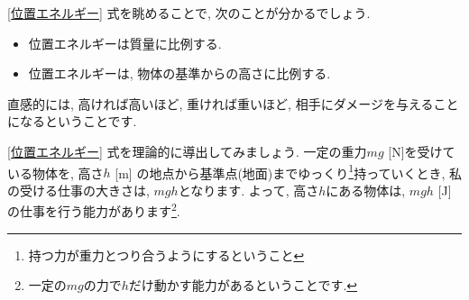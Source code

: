 \documentclass[11pt,dvipdfmx]{jsarticle}
\numberwithin{equation}{section} %
\begin{document}
\eqref{位置エネルギー} 式を眺めることで, 次のことが分かるでしょう.
\begin{itemize}
    \item 位置エネルギーは質量に比例する.
    \item 位置エネルギーは, 物体の基準からの高さに比例する. 
\end{itemize}
直感的には, 高ければ高いほど, 重ければ重いほど, 相手にダメージを与えることになるということです. 

\eqref{位置エネルギー} 式を理論的に導出してみましょう. 一定の重力$mg$ [N]を受けている物体を, 高さ$h$ [m] の地点から基準点(地面)までゆっくり\footnote{持つ力が重力とつり合うようにするということ}持っていくとき, 私の受ける仕事の大きさは, $mgh$となります. よって, 高さ$h$にある物体は, $mgh$ [J] の仕事を行う能力があります\footnote{一定の$mg$の力で$h$だけ動かす能力があるということです.}. 
\end{document}
